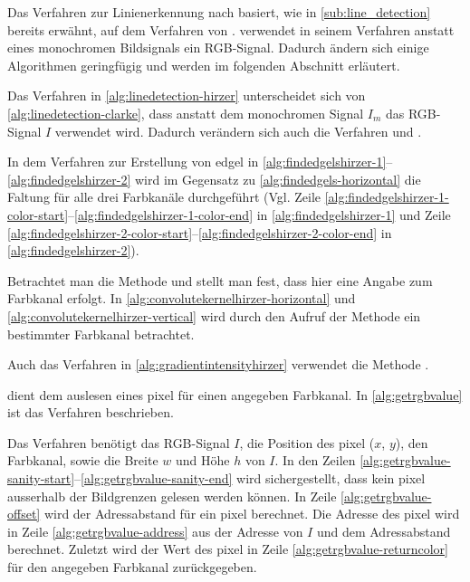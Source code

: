 Das Verfahren zur Linienerkennung nach \citeauthor{hirzer08} basiert, wie in \autoref{sub:line_detection} bereits
 erwähnt, auf dem Verfahren von \citeauthor{clarke96}. \citeauthor{hirzer08} verwendet in seinem Verfahren anstatt
 eines monochromen Bildsignals ein RGB-Signal. Dadurch ändern sich einige Algorithmen geringfügig und werden im
 folgenden Abschnitt erläutert.

Das Verfahren in \autoref{alg:linedetection-hirzer} unterscheidet sich von \autoref{alg:linedetection-clarke}, dass
 anstatt dem monochromen Signal $I_m$ das RGB-Signal $I$ verwendet wird. Dadurch verändern sich auch die Verfahren
  und .



In dem Verfahren zur Erstellung von \gls{edgel} in \autoref{alg:findedgelshirzer-1}--\autoref{alg:findedgelshirzer-2}
 wird im Gegensatz zu \autoref{alg:findedgels-horizontal} die Faltung für alle drei Farbkanäle durchgeführt (Vgl. Zeile
 \ref{alg:findedgelshirzer-1-color-start}--\ref{alg:findedgelshirzer-1-color-end} in \autoref{alg:findedgelshirzer-1}
 und Zeile \ref{alg:findedgelshirzer-2-color-start}--\ref{alg:findedgelshirzer-2-color-end} in
 \autoref{alg:findedgelshirzer-2}).




Betrachtet man die Methode  und  stellt man fest, dass hier eine
 Angabe zum Farbkanal erfolgt. In \autoref{alg:convolutekernelhirzer-horizontal} und
 \autoref{alg:convolutekernelhirzer-vertical} wird durch den Aufruf der Methode  ein bestimmter
 Farbkanal betrachtet.



Auch das Verfahren  in \autoref{alg:gradientintensityhirzer} verwendet die Methode
 .



 dient dem auslesen eines \gls{pixel} für einen angegeben Farbkanal. In \autoref{alg:getrgbvalue} ist das Verfahren beschrieben.



Das Verfahren benötigt das RGB-Signal $I$, die Position des \gls{pixel} ($x$, $y$), den Farbkanal, sowie die Breite $w$
 und Höhe $h$ von $I$. In den Zeilen \ref{alg:getrgbvalue-sanity-start}--\ref{alg:getrgbvalue-sanity-end} wird
 sichergestellt, dass kein \gls{pixel} ausserhalb der Bildgrenzen gelesen werden können. In Zeile
 \ref{alg:getrgbvalue-offset} wird der Adressabstand für ein \gls{pixel} berechnet. Die Adresse des \gls{pixel} wird in
 Zeile \ref{alg:getrgbvalue-address} aus der Adresse von $I$ und dem Adressabstand berechnet. Zuletzt wird der Wert des
 \gls{pixel} in Zeile \ref{alg:getrgbvalue-returncolor} für den angegeben Farbkanal zurückgegeben.

